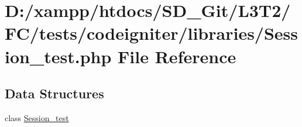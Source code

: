\hypertarget{_session__test_8php}{}\section{D\+:/xampp/htdocs/\+S\+D\+\_\+\+Git/\+L3\+T2/\+F\+C/tests/codeigniter/libraries/\+Session\+\_\+test.php File Reference}
\label{_session__test_8php}
\subsection*{Data Structures}
\begin{DoxyCompactItemize}
\item 
class \hyperlink{class_session__test}{Session\+\_\+test}
\end{DoxyCompactItemize}
